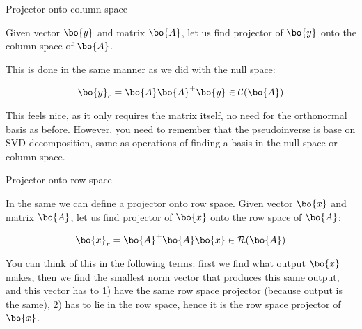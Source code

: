 \documentclass{beamer}
\begin{document}
\begin{frame}{Projector onto column space}
\begin{flushleft}

Given vector $\bo{y}$ and matrix $\bo{A}$, let us find projector of $\bo{y}$ onto the column space of $\bo{A}$.

\bigskip

This is done in the same manner as we did with the null space:

\begin{equation}
    \bo{y}_c = \bo{A}\bo{A}^+ \bo{y} \in \mathcal{C}(\bo{A})
\end{equation}

This feels nice, as it only requires the matrix itself, no need for the orthonormal basis as before. However, you need to remember that the pseudoinverse is base on SVD decomposition, same as operations of finding a basis in the null space or column space.

\end{flushleft}
\end{frame}



\begin{frame}{Projector onto row space}
\begin{flushleft}

In the same we can define a projector onto row space. Given vector $\bo{x}$ and matrix $\bo{A}$, let us find projector of $\bo{x}$ onto the row space of $\bo{A}$:

\begin{equation}
    \bo{x}_r = \bo{A}^+\bo{A} \bo{x} \in \mathcal{R}(\bo{A})
\end{equation}

You can think of this in the following terms: first we find what output $\bo{x}$ makes, then we find the smallest norm vector that produces this same output, and this vector has to 1) have the same row space projector (because output is the same), 2) has to lie in the row space, hence it is the row space projector of $\bo{x}$.

\end{flushleft}
\end{frame}
\end{document}

